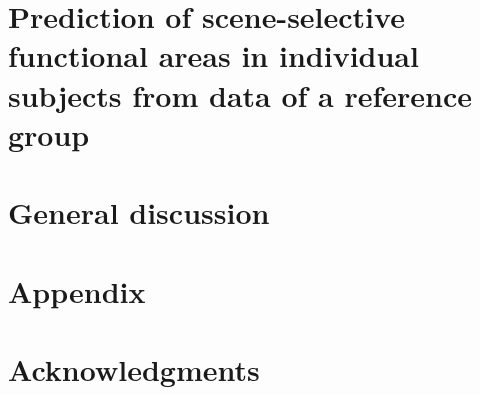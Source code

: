 \documentclass[english,12pt]{report}
\begin{document}
\begin{spacing}{1.5}
\chapter{Prediction of scene-selective functional areas in individual subjects
from data of a reference group}






\chapter{General discussion}






% 







\chapter{Appendix}





\chapter*{Acknowledgments}










\end{spacing}
\end{document}
